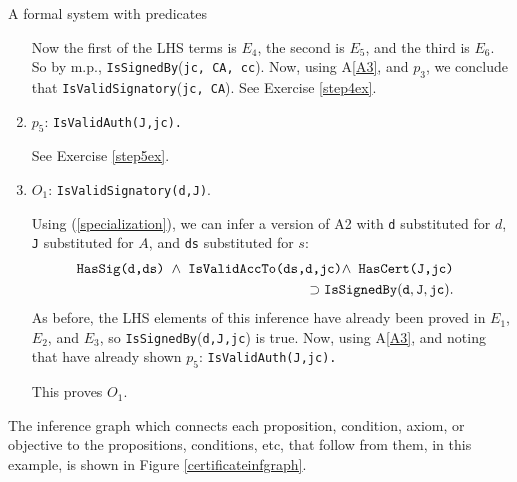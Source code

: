 \begin{example}{A formal system with predicates}
\begin{enumerate}[1.]
Now the first of the LHS terms is $E_4$, the second is $E_5$, and the third is $E_{6}$.
So by m.p., {\tt IsSignedBy}({\tt jc, CA, cc}). Now, using A\ref{A3}, and $p_3$, we conclude
that \hbox{\tt IsValidSignatory}({\tt jc, CA}).
\else
See Exercise \ref{step4ex}.
\fi
%

\item{}\label{step5} 
$p_5$: {\tt IsValidAuth(J,jc).}
\iffalse

By $E_4$: {{\tt HasSig(jc,jcs)}};

$E_5$: {{\tt IsValidAccTo(jcs,jc,cc)}};
$p_4$: {\tt IsValidSignatory(}cc,J,jc{\tt )};
and A\ref{A1}, {\tt IsValidCert(}J,jc{\tt )}. 

By $E_3$, {\tt HasCert(}J,jc{\tt )}, so by A\ref{A4},
{\tt IsValidAuth(}J,jc{\tt )}. 
\else
See Exercise \ref{step5ex}.
\fi


\item{}\label{step6} 
$O_1$: {\tt IsValidSignatory(d,J)}.

Using (\ref{specialization}), we can infer a version of A2 with {\tt d} substituted for $d$,
{\tt J} substituted for $A$, and {\tt ds} substituted for $s$:
\begin{eqnarray}\label{A1a}\nonumber
&&\hspace{-7mm}\hbox{\tt HasSig(d,ds) $\wedge$ IsValidAccTo(ds,d,jc)$\wedge$ HasCert(J,jc)} \\
		&&\hspace{-7mm}\nonumber
\supset \hbox{\tt IsSignedBy}({\tt d, J, jc}).
\end{eqnarray}
As before, the LHS elements of this inference have already been proved in $E_1$, $E_2$, and $E_3$,
so \hbox{\tt IsSignedBy}({\tt d,J,jc}) is true. Now, using A\ref{A3}, and noting that
have already shown $p_5$: {\tt IsValidAuth(J,jc).}

This proves $O_1$.
%
%
\end{enumerate}

The inference graph which connects each proposition, condition, axiom, or objective to the 
propositions, conditions, etc, that follow from them, in this example, is shown in Figure
\ref{certificateinfgraph}.


\end{example}
